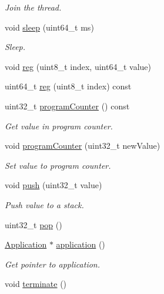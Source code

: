 \begin{DoxyCompactItemize}
\begin{DoxyCompactList}\small\item\em Join the thread. \end{DoxyCompactList}\item 
void \mbox{\hyperlink{struct_evm_1_1_thread_context_a4f9e4331dffb52e0165c3ffc27ca1421}{sleep}} (uint64\+\_\+t ms)
\begin{DoxyCompactList}\small\item\em Sleep. \end{DoxyCompactList}\item 
void \mbox{\hyperlink{struct_evm_1_1_thread_context_ae095ee4a87d555fa4c3a55584b058ebb}{reg}} (uint8\+\_\+t index, uint64\+\_\+t value)
\item 
uint64\+\_\+t \mbox{\hyperlink{struct_evm_1_1_thread_context_a7a599a3cce4260d4c54be752e20bace8}{reg}} (uint8\+\_\+t index) const
\item 
uint32\+\_\+t \mbox{\hyperlink{struct_evm_1_1_thread_context_a25d16549548a3c6dc375e25da9729ccc}{program\+Counter}} () const
\begin{DoxyCompactList}\small\item\em Get value in program counter. \end{DoxyCompactList}\item 
void \mbox{\hyperlink{struct_evm_1_1_thread_context_accc8a047d91d5dc8defd19d9a1a1e5a1}{program\+Counter}} (uint32\+\_\+t new\+Value)
\begin{DoxyCompactList}\small\item\em Set value to program counter. \end{DoxyCompactList}\item 
void \mbox{\hyperlink{struct_evm_1_1_thread_context_aaf430328926f33c679492b43e79ca302}{push}} (uint32\+\_\+t value)
\begin{DoxyCompactList}\small\item\em Push value to a stack. \end{DoxyCompactList}\item 
uint32\+\_\+t \mbox{\hyperlink{struct_evm_1_1_thread_context_aaa860b37b80d9f68292c04df7f7bf030}{pop}} ()
\item 
\mbox{\hyperlink{struct_evm_1_1_application}{Application}} $\ast$ \mbox{\hyperlink{struct_evm_1_1_thread_context_ace9600627e2e504650735d1c132897ad}{application}} ()
\begin{DoxyCompactList}\small\item\em Get pointer to application. \end{DoxyCompactList}\item 
void \mbox{\hyperlink{struct_evm_1_1_thread_context_aed1e36bdf15b042767c1301d5901ba6c}{terminate}} ()
\end{DoxyCompactItemize}


